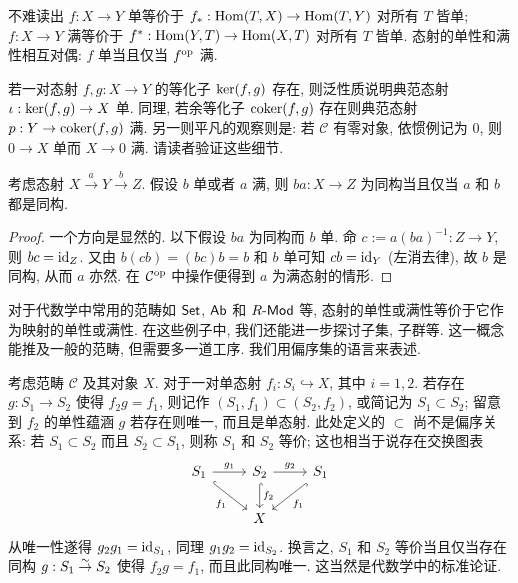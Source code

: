 不难读出 $f: X \to Y$ 单等价于 $f_*: \operatorname{Hom}(T, X) \to \operatorname{Hom}(T, Y)$ 对所有 $T$ 皆单; $f: X \to Y$ 满等价于 $f^*: \operatorname{Hom}(Y, T) \to \operatorname{Hom}(X, T)$ 对所有 $T$ 皆单. 态射的单性和满性相互对偶: $f$ 单当且仅当 $f^{\operatorname{op}}$ 满.

\begin{example}
	若一对态射 $f, g: X \to Y$ 的等化子 $\operatorname{ker}(f,g)$ 存在, 则泛性质说明典范态射 $\iota: \operatorname{ker}(f,g) \to X$ 单. 同理, 若余等化子 $\operatorname{coker}(f,g)$ 存在则典范态射 $p: Y \to \operatorname{coker}(f,g)$ 满. 另一则平凡的观察则是: 若 $\mathcal{C}$ 有零对象, 依惯例记为 $0$, 则 $0 \to X$ 单而 $X \to 0$ 满. 请读者验证这些细节.
\end{example}

\begin{proposition}\label{prop:epi-mono-isomorphism}
	考虑态射 $X \xrightarrow{a} Y \xrightarrow{b} Z$. 假设 $b$ 单或者 $a$ 满, 则 $ba: X \to Z$ 为同构当且仅当 $a$ 和 $b$ 都是同构.
\end{proposition}
\begin{proof}
	一个方向是显然的. 以下假设 $ba$ 为同构而 $b$ 单. 命 $c := a(ba)^{-1}: Z \to Y$, 则 $bc = \mathrm{id}_Z$. 又由 $b(cb) = (bc) b = b$ 和 $b$ 单可知 $cb = \mathrm{id}_Y$ (左消去律), 故 $b$ 是同构, 从而 $a$ 亦然. 在 $\mathcal{C}^{\operatorname{op}}$ 中操作便得到 $a$ 为满态射的情形.
\end{proof}

对于代数学中常用的范畴如 $\mathsf{Set}$, $\mathsf{Ab}$ 和 $R\text{-}\mathsf{Mod}$ 等, 态射的单性或满性等价于它作为映射的单性或满性. 在这些例子中, 我们还能进一步探讨子集, 子群等. 这一概念能推及一般的范畴, 但需要多一道工序. 我们用偏序集的语言来表述.

考虑范畴 $\mathcal{C}$ 及其对象 $X$. 对于一对单态射 $f_i: S_i \hookrightarrow X$, 其中 $i = 1, 2$. 若存在 $g: S_1 \to S_2$ 使得 $f_2 g = f_1$, 则记作 $(S_1, f_1) \subset (S_2, f_2)$, 或简记为 $S_1 \subset S_2$; 留意到 $f_2$ 的单性蕴涵 $g$ 若存在则唯一, 而且是单态射. 此处定义的 $\subset$ 尚不是偏序关系: 若 $S_1 \subset S_2$ 而且 $S_2 \subset S_1$, 则称 $S_1$ 和 $S_2$ 等价; 这也相当于说存在交换图表
\[\begin{tikzcd}
	S_1 \arrow[r, "g_1"] \arrow[hookrightarrow, rd, "f_1"'] & S_2 \arrow[hookrightarrow, d, "f_2"] \arrow[r, "g_2"] & S_1 \arrow[hookrightarrow, ld, "f_1"] \\
	& X &
\end{tikzcd}\]
从唯一性遂得 $g_2 g_1 = \mathrm{id}_{S_1}$, 同理 $g_1 g_2 = \mathrm{id}_{S_2}$. 换言之, $S_1$ 和 $S_2$ 等价当且仅当存在同构 $g: S_1 \stackrel{\sim}{\rightarrow} S_2$ 使得 $f_2 g = f_1$, 而且此同构唯一. 这当然是代数学中的标准论证.


